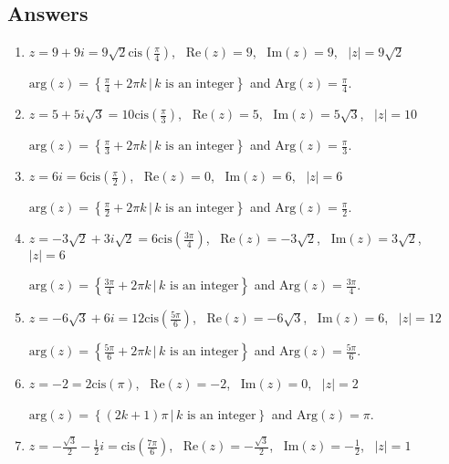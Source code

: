 \subsection{Answers}

\begin{enumerate}

\item $z = 9 + 9i = 9\sqrt{2}\text{cis}\left(\frac{\pi}{4}\right)$, \, $\text{Re}(z) = 9$, \, $\text{Im}(z) = 9$, \, $|z| = 9\sqrt{2}$

$\text{arg}(z) = \left\{\frac{\pi}{4} + 2\pi k \, | \, \text{$k$ is an integer} \right\}$ and $\text{Arg}(z) = \frac{\pi}{4}$.

\item $z = 5+5i\sqrt{3} = 10\text{cis}\left(\frac{\pi}{3}\right)$, \, $\text{Re}(z) = 5$, \, $\text{Im}(z) = 5\sqrt{3}$, \, $|z| = 10$

$\text{arg}(z) = \left\{\frac{\pi}{3} + 2\pi k \, | \, \text{$k$ is an integer} \right\}$ and $\text{Arg}(z) = \frac{\pi}{3}$.

\item $z = 6i = 6\text{cis}\left(\frac{\pi}{2}\right)$, \, $\text{Re}(z) = 0$, \, $\text{Im}(z) = 6$, \, $|z| = 6$

$\text{arg}(z) = \left\{\frac{\pi}{2} + 2\pi k \, | \, \text{$k$ is an integer} \right\}$ and $\text{Arg}(z) = \frac{\pi}{2}$.

\item $z = -3\sqrt{2} + 3i\sqrt{2} = 6\text{cis}\left(\frac{3\pi}{4}\right)$, \, $\text{Re}(z) = -3\sqrt{2}$, \, $\text{Im}(z) =3\sqrt{2}$, \, $|z| = 6$

$\text{arg}(z) = \left\{\frac{3\pi}{4} + 2\pi k \, | \, \text{$k$ is an integer} \right\}$ and $\text{Arg}(z) = \frac{3\pi}{4}$.

\item $z =  -6\sqrt{3} + 6i = 12\text{cis}\left(\frac{5\pi}{6}\right)$, \, $\text{Re}(z) = -6\sqrt{3}$, \, $\text{Im}(z) =6$, \, $|z| = 12$

$\text{arg}(z) = \left\{\frac{5\pi}{6} + 2\pi k \, | \, \text{$k$ is an integer} \right\}$ and $\text{Arg}(z) = \frac{5\pi}{6}$.

\item $z =  -2 = 2\text{cis}\left(\pi\right)$, \, $\text{Re}(z) = -2$, \, $\text{Im}(z) =0$, \, $|z| = 2$

$\text{arg}(z) = \left\{(2k+1)\pi \, | \, \text{$k$ is an integer} \right\}$ and $\text{Arg}(z) = \pi$.

\item $z = -\frac{\sqrt{3}}{2} - \frac{1}{2}i = \text{cis}\left(\frac{7\pi}{6}\right)$, \, $\text{Re}(z) = -\frac{\sqrt{3}}{2}$, \, $\text{Im}(z) = -\frac{1}{2}$, \, $|z| = 1$


\end{enumerate}

